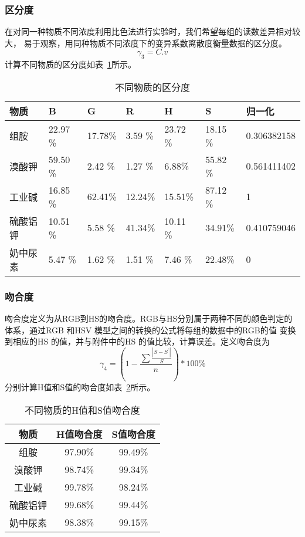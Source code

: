     \subsubsection{区分度}
    在对同一种物质不同浓度利用比色法进行实验时，我们希望每组的读数差异相对较大，
    易于观察，用同种物质不同浓度下的变异系数离散度衡量数据的区分度。
    $$\gamma_3=C.v$$
    计算不同物质的区分度如表~\ref{不同物质区分度}所示。
    \begin{table}[H]
    \centering
    \caption{不同物质的区分度}
    \label{不同物质区分度}
    \begin{tabular}{@{}lllllll@{}}
    \toprule
    物质   & B     & G     & R     & H     & S     & 归一化         \\ \midrule
    组胺   & 22.97 \%& 17.78\% & 3.59 \% & 23.72 \%& 18.15 \%& 0.306382158 \\
    溴酸钾  & 59.50 \%& 2.42 \% & 1.27 \% & 6.88\%  & 55.82 \%& 0.561411402 \\
    工业碱  & 16.85 \%& 62.41\% & 12.24\% & 15.51\% & 87.12 \%& 1           \\
    硫酸铝钾 & 10.51 \%& 5.58 \% & 41.34\% & 10.11 \%& 34.91\% & 0.410759046 \\
    奶中尿素 & 5.47  \%& 1.62 \% & 1.51 \% & 7.46 \% & 22.48\% & 0           \\ \bottomrule
    \end{tabular}
    \end{table}
    
    
    \subsubsection{吻合度}
    吻合度定义为从RGB到HS的吻合度。RGB与HS分别属于两种不同的颜色判定的体系，通过RGB 和HSV 模型之间的转换的公式将每组的数据中的RGB的值
    变换到相应的HS 的值，并与附件中的HS 的值比较，计算误差。定义吻合度为
    $$\gamma_4=(1-\frac{\sum\frac{|S-S^{'}|}{S}}{n})*100\%$$
    分别计算H值和S值的吻合度如表~\ref{吻合度表}所示。
    \begin{table}[H]
      \centering
      \caption{不同物质的H值和S值吻合度}
      \label{吻合度表}
      \begin{tabular}{@{}ccc@{}}
      \toprule
      物质 & H值吻合度  & S值吻合度   \\ \midrule
      组胺 & 97.90\% & 99.49\% \\
      溴酸钾 & 98.74\% & 99.34\% \\
      工业碱 & 99.78\% & 98.24\% \\
      硫酸铝钾 & 99.68\% & 99.44\% \\
      奶中尿素 & 98.38\% & 99.15\% \\ \bottomrule
      \end{tabular}
    \end{table}
    

